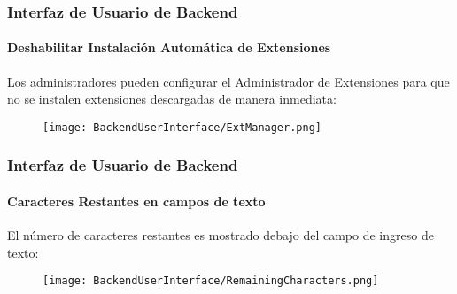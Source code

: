\begin{frame}[fragile]
	\frametitle{Interfaz de Usuario de Backend}
	\framesubtitle{Deshabilitar Instalación Automática de Extensiones}

	Los administradores pueden configurar el Administrador de Extensiones
	para que no se instalen extensiones descargadas de manera inmediata:

	\begin{figure}
		\texttt{[image: BackendUserInterface/ExtManager.png]}
	\end{figure}

\end{frame}

\begin{frame}[fragile]
	\frametitle{Interfaz de Usuario de Backend}
	\framesubtitle{Caracteres Restantes en campos de texto}

	El número de caracteres restantes es mostrado debajo del campo de ingreso de texto:

	\begin{figure}
		\texttt{[image: BackendUserInterface/RemainingCharacters.png]}
	\end{figure}

\end{frame}

